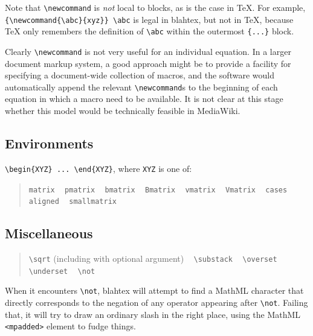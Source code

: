 \documentclass{article}
\newcommand{\texcommand}[1]{\textbackslash{}#1}
\newcommand{\spacer}{\,\,\, \hfil}
\newcommand{\lastspacer}{\hfill\hfill\hfill}
\newenvironment{mylist}{\begin{quote}}{\end{quote}}
\begin{document}
Note that \texttt{\texcommand{newcommand}} is \emph{not} local to blocks, as is the case in \TeX{}. For example, \texttt{\{\texcommand{newcommand}\{\texcommand{abc}\}\{xyz\}\}  \texcommand{abc}} is legal in blahtex, but not in \TeX{}, because \TeX{} only remembers the definition of \texttt{\texcommand{abc}} within the outermost \texttt{\{...\}} block.

Clearly \texttt{\texcommand{newcommand}} is not very useful for an individual equation. In a larger document markup system, a good approach might be to provide a facility for specifying a document-wide collection of macros, and the software would automatically append the relevant \texttt{\texcommand{newcommand}}s to the beginning of each equation in which a macro need to be available. It is not clear at this stage whether this model would be technically feasible in MediaWiki.

\subsection{Environments}

\texttt{\texcommand{begin}\{XYZ\} ... \texcommand{end}\{XYZ\}}, where \texttt{XYZ} is one of: 

\begin{mylist}
\texttt{matrix} \spacer
\texttt{pmatrix} \spacer
\texttt{bmatrix} \spacer
\texttt{Bmatrix} \spacer
\texttt{vmatrix} \spacer
\texttt{Vmatrix} \spacer
\texttt{cases} \spacer
\texttt{aligned} \spacer
\texttt{smallmatrix} \lastspacer
\end{mylist}

\subsection{Miscellaneous}

\begin{mylist}
\texttt{\texcommand{sqrt}} (including with optional argument) \spacer
\texttt{\texcommand{substack}} \spacer
\texttt{\texcommand{overset}} \spacer
\texttt{\texcommand{underset}} \spacer
\texttt{\texcommand{not}} \lastspacer
\end{mylist}

When it encounters \texttt{\texcommand{not}}, blahtex will attempt to find a MathML character that directly corresponds to the negation of any operator appearing after \texttt{\texcommand{not}}. Failing that, it will try to draw an ordinary slash in the right place, using the MathML \texttt{<mpadded>} element to fudge things.
\end{document}
